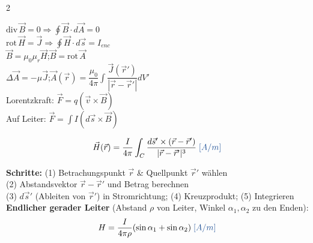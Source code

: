 \documentclass[a4paper, 7.5pt]{extarticle}
\begin{document}
\begin{multicols*}{2}
\begin{tcolorbox}[title={Grundgleichungen Magnetostatik}]
$\text{div}\,\vec{B} = 0 \Rightarrow \oint\vec{B}\cdot d\vec{A} = 0$ \;\text{\textcolor{boxtitle}{[\(T = Vs/m^2\)]}}\\
$\text{rot}\,\vec{H} = \vec{J} \Rightarrow \oint\vec{H}\cdot d\vec{s} = I_{enc}$ \;\text{\textcolor{boxtitle}{[\(A/m\)]}}\\
$\vec{B} = \mu_0\mu_r\vec{H}$;\quad $\vec{B} = \text{rot}\,\vec{A}$ \;\text{\textcolor{boxtitle}{[\(T\)]}}\\
$\Delta\vec{A} = -\mu\vec{J}$;\quad $\vec{A}(\vec{r}) = \dfrac{\mu_0}{4\pi}\int\dfrac{\vec{J}(\vec{r}')}{|\vec{r}-\vec{r}'|}dV'$ \;\text{\textcolor{boxtitle}{[\(Vs/m\)]}}\\
Lorentzkraft: $\vec{F} = q(\vec{v}\times\vec{B})$ \;\text{\textcolor{boxtitle}{[\(N\)]}}\\
Auf Leiter: $\vec{F} = \int I(d\vec{s}\times\vec{B})$ \;\text{\textcolor{boxtitle}{[\(N\)]}}
\end{tcolorbox}

\begin{tcolorbox}[title={Biot-Savart -- Gesetz \& Vorgehen}]
$$\vec{H}(\vec{r}) = \frac{I}{4\pi}\int_C\frac{d\vec{s}'\times(\vec{r}-\vec{r}')}{|\vec{r}-\vec{r}'|^3} \;\text{\textcolor{boxtitle}{[\(A/m\)]}}$$
\begin{center}
\end{center}
\textbf{Schritte:} (1) Betrachungspunkt $\vec{r}$ \& Quellpunkt $\vec{r}'$ wählen\\
(2) Abstandsvektor $\vec{r}-\vec{r}'$ und Betrag berechnen\\
(3) $d\vec{s}'$ (Ableiten von $\vec{r}'$) in Stromrichtung; (4) Kreuzprodukt; (5) Integrieren\\[2pt]
\textbf{Endlicher gerader Leiter} (Abstand $\rho$ von Leiter, Winkel $\alpha_1, \alpha_2$ zu den Enden):
$$H = \frac{I}{4\pi\rho}(\sin\alpha_1+\sin\alpha_2) \;\text{\textcolor{boxtitle}{[\(A/m\)]}}$$
\end{tcolorbox}


\end{multicols*}
\end{document}
